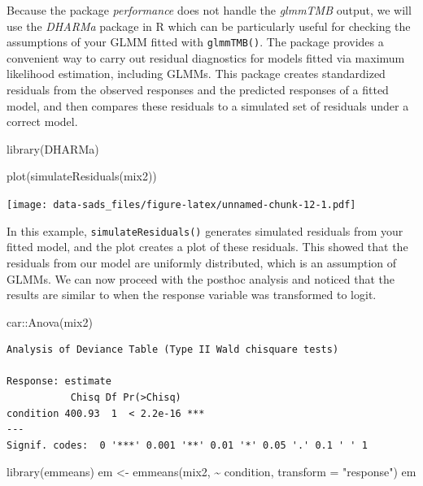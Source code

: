 \documentclass[
  letterpaper,
]{book}
\newenvironment{Shaded}{\begin{snugshade}}{\end{snugshade}}
\newcommand{\AttributeTok}[1]{\textcolor[rgb]{0.40,0.45,0.13}{#1}}
\newcommand{\FunctionTok}[1]{\textcolor[rgb]{0.28,0.35,0.67}{#1}}
\newcommand{\NormalTok}[1]{\textcolor[rgb]{0.00,0.23,0.31}{#1}}
\newcommand{\OtherTok}[1]{\textcolor[rgb]{0.00,0.23,0.31}{#1}}
\newcommand{\SpecialCharTok}[1]{\textcolor[rgb]{0.37,0.37,0.37}{#1}}
\newcommand{\StringTok}[1]{\textcolor[rgb]{0.13,0.47,0.30}{#1}}
\begin{document}
Because the package \emph{performance} does not handle the
\emph{glmmTMB} output, we will use the \emph{DHARMa} package in R which
can be particularly useful for checking the assumptions of your GLMM
fitted with \texttt{glmmTMB()}. The package provides a convenient way to
carry out residual diagnostics for models fitted via maximum likelihood
estimation, including GLMMs. This package creates standardized residuals
from the observed responses and the predicted responses of a fitted
model, and then compares these residuals to a simulated set of residuals
under a correct model.

\begin{Shaded}
\begin{Highlighting}[]
\FunctionTok{library}\NormalTok{(DHARMa)}

\FunctionTok{plot}\NormalTok{(}\FunctionTok{simulateResiduals}\NormalTok{(mix2))}
\end{Highlighting}
\end{Shaded}

\texttt{[image: data-sads\_files/figure-latex/unnamed-chunk-12-1.pdf]}

In this example, \texttt{simulateResiduals()} generates simulated
residuals from your fitted model, and the plot creates a plot of these
residuals. This showed that the residuals from our model are uniformly
distributed, which is an assumption of GLMMs. We can now proceed with
the posthoc analysis and noticed that the results are similar to when
the response variable was transformed to logit.

\begin{Shaded}
\begin{Highlighting}[]
\NormalTok{car}\SpecialCharTok{::}\FunctionTok{Anova}\NormalTok{(mix2)}
\end{Highlighting}
\end{Shaded}

\begin{verbatim}
Analysis of Deviance Table (Type II Wald chisquare tests)

Response: estimate
           Chisq Df Pr(>Chisq)    
condition 400.93  1  < 2.2e-16 ***
---
Signif. codes:  0 '***' 0.001 '**' 0.01 '*' 0.05 '.' 0.1 ' ' 1
\end{verbatim}

\begin{Shaded}
\begin{Highlighting}[]
\FunctionTok{library}\NormalTok{(emmeans)}
\NormalTok{em }\OtherTok{\textless{}{-}} \FunctionTok{emmeans}\NormalTok{(mix2, }\SpecialCharTok{\textasciitilde{}}\NormalTok{ condition, }\AttributeTok{transform =} \StringTok{"response"}\NormalTok{)}
\NormalTok{em}
\end{Highlighting}
\end{Shaded}
\end{document}
